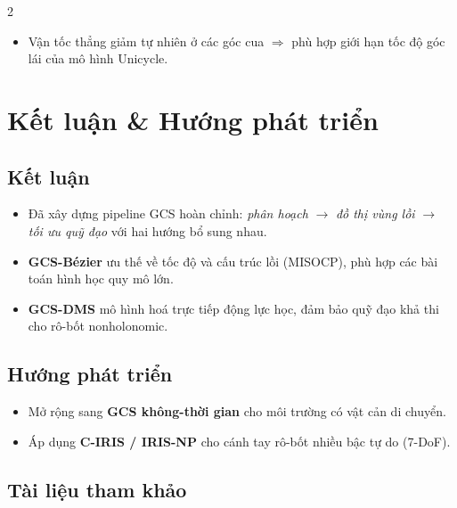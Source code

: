 \documentclass[final]{beamer}
\begin{document}
\begin{frame}[t]
\begin{multicols}{2}
\begin{itemize}
    \item Vận tốc thẳng giảm tự nhiên ở các góc cua $\Rightarrow$ phù hợp giới hạn
    tốc độ góc lái của mô hình Unicycle.
\end{itemize}


\section{Kết luận \& Hướng phát triển}

\subsection{Kết luận}

\begin{itemize}
    \item Đã xây dựng pipeline GCS hoàn chỉnh: \emph{phân hoạch} $\to$ \emph{đồ thị vùng lồi}
    $\to$ \emph{tối ưu quỹ đạo} với hai hướng bổ sung nhau.
    \item \textbf{GCS-Bézier} ưu thế về tốc độ và cấu trúc lồi (MISOCP),
    phù hợp các bài toán hình học quy mô lớn.
    \item \textbf{GCS-DMS} mô hình hoá trực tiếp động lực học, đảm bảo quỹ đạo
    khả thi cho rô-bốt nonholonomic.
\end{itemize}

\subsection{Hướng phát triển}

\begin{itemize}
    \item Mở rộng sang \textbf{GCS không-thời gian} cho môi trường có vật cản di chuyển.
    \item Áp dụng \textbf{C-IRIS / IRIS-NP} cho cánh tay rô-bốt nhiều bậc tự do (7-DoF).
\end{itemize}


\subsection{Tài liệu tham khảo}


\end{multicols}
\end{frame}
\end{document}
